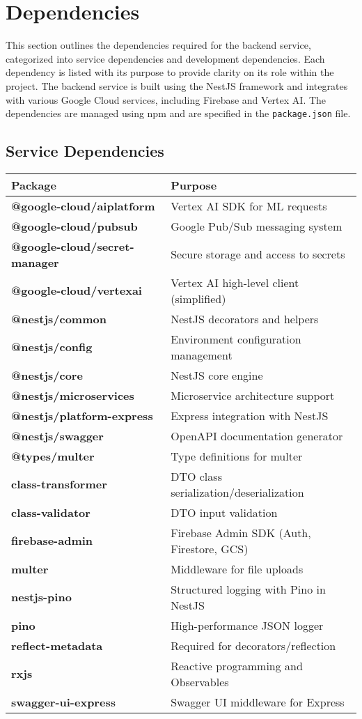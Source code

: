\section{Dependencies}

This section outlines the dependencies required for the backend service, categorized into service dependencies and development dependencies. Each dependency is listed with its purpose to provide clarity on its role within the project.
The backend service is built using the NestJS framework and integrates with various Google Cloud services, including Firebase and Vertex AI. The dependencies are managed using npm and are specified in the \texttt{package.json} file.

\subsection{Service Dependencies}

\begin{tabular}{>{\bfseries}l l}
\toprule
Package & Purpose \\
\midrule
@google-cloud/aiplatform & Vertex AI SDK for ML requests \\
@google-cloud/pubsub & Google Pub/Sub messaging system \\
@google-cloud/secret-manager & Secure storage and access to secrets \\
@google-cloud/vertexai & Vertex AI high-level client (simplified) \\
@nestjs/common & NestJS decorators and helpers \\
@nestjs/config & Environment configuration management \\
@nestjs/core & NestJS core engine \\
@nestjs/microservices & Microservice architecture support \\
@nestjs/platform-express & Express integration with NestJS \\
@nestjs/swagger & OpenAPI documentation generator \\
@types/multer & Type definitions for multer \\
class-transformer & DTO class serialization/deserialization \\
class-validator & DTO input validation \\
firebase-admin & Firebase Admin SDK (Auth, Firestore, GCS) \\
multer & Middleware for file uploads \\
nestjs-pino & Structured logging with Pino in NestJS \\
pino & High-performance JSON logger \\
reflect-metadata & Required for decorators/reflection \\
rxjs & Reactive programming and Observables \\
swagger-ui-express & Swagger UI middleware for Express \\
\bottomrule
\end{tabular}

